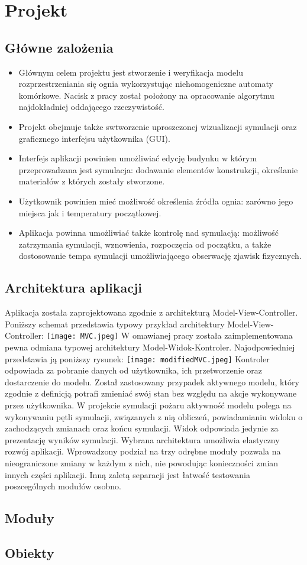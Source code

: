 \chapter {Projekt}
\label{cha:projekt}
\section {Główne zalożenia}
\begin {itemize}
\item Głównym celem projektu jest stworzenie i weryfikacja modelu rozprzestrzeniania się ognia wykorzystując niehomogeniczne automaty
komórkowe. Nacisk z pracy został położony na opracowanie algorytmu najdokładniej oddającego rzeczywistość.
\item Projekt obejmuje także swtworzenie uproszczonej wizualizacji symulacji oraz graficznego interfejsu użytkownika (GUI).
\item Interfejs aplikacji powinien umożliwiać edycję budynku w którym przeprowadzana jest symulacja: dodawanie elementów konstrukcji, 
określanie materiałów z których zostały stworzone. 
\item Użytkownik powinien mieć możliwość określenia źródła ognia: zarówno jego miejsca jak i temperatury początkowej.
\item Aplikacja powinna umożliwiać także kontrolę nad symulacją: możliwość zatrzymania symulacji, wznowienia, rozpoczęcia od początku,
a także dostosowanie tempa symulacji umożliwiającego obserwację zjawisk fizycznych.
\end {itemize}
\section {Architektura aplikacji}
Aplikacja została zaprojektowana zgodnie z architekturą Model-View-Controller.
Poniższy schemat przedstawia typowy przykład architektury Model-View-Controller:
\texttt{[image: MVC.jpeg]}
W omawianej pracy została zaimplementowana pewna odmiana typowej architektury Model-Widok-Kontroler.
Najodpowiedniej przedstawia ją poniższy rysunek:
\texttt{[image: modifiedMVC.jpeg]}
Kontroler odpowiada za pobranie danych od użytkownika, ich przetworzenie oraz dostarczenie do modelu.
Został zastosowany przypadek aktywnego modelu, który zgodnie z definicją potrafi zmieniać swój stan 
bez względu na akcje wykonywane przez użytkownika. W projekcie symulacji pożaru aktywność modelu polega na 
wykonywaniu pętli symulacji, związanych z nią obliczeń, powiadamianiu widoku o zachodzących zmianach oraz
końcu symulacji. Widok odpowiada jedynie za prezentację wyników symulacji.
Wybrana architektura umożliwia elastyczny rozwój aplikacji. Wprowadzony podział na trzy odrębne moduły pozwala
na nieograniczone zmiany w każdym z nich, nie powodując konieczności zmian innych części aplikacji.
Inną zaletą separacji jest łatwość testowania poszcególnych modułów osobno. 
\section {Moduły}
\section {Obiekty}

